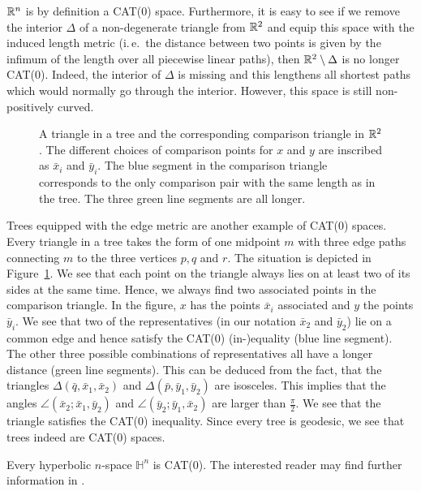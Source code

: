 \begin{bsp}
  \(\mathbb{R}^n\) is by definition a CAT(0) space. Furthermore, it is easy to see if we remove the interior \(\Delta\) of a non-degenerate triangle from \(\mathbb{R}^2\) and equip this space with the induced length metric (i.\,e.\ the distance between two points is given by the infimum of the length over all piecewise linear paths), then \(\mathbb{R}^2 \setminus \Delta\) is no longer CAT(0). Indeed, the interior of \(\Delta\) is missing and this lengthens all shortest paths which would normally go through the interior. However, this space is still non-positively curved.
\end{bsp}
\begin{bsp}[Trees]
  \begin{figure}[htbp]
    \centering
    
    \caption{A triangle in a tree and the corresponding comparison triangle in \(\mathbb{R}^2\). The different choices of comparison points for \(x\) and \(y\) are inscribed as \(\bar x_i\) and \(\bar y_i\). The blue segment in the comparison triangle corresponds to the only comparison pair with the same length as in the tree. The three green line segments are all longer.}
    \label{fig:cat-tree}
  \end{figure}
  Trees equipped with the edge metric are another example of CAT(0) spaces. Every triangle in a tree takes the form of one midpoint \(m\) with three edge paths connecting \(m\) to the three vertices \(p,q\) and \(r\). The situation is depicted in Figure~\ref{fig:cat-tree}. We see that each point on the triangle always lies on at least two of its sides at the same time. Hence, we always find two associated points in the comparison triangle. In the figure, \(x\) has the points \(\bar x_i\) associated and \(y\) the points \(\bar y_i\). We see that two of the representatives (in our notation \(\bar x_2\) and \(\bar y_2\)) lie on a common edge and hence satisfy the CAT(0) (in-)equality (blue line segment). The other three possible combinations of representatives all have a longer distance (green line segments). This can be deduced from the fact, that the triangles \(\Delta(\bar q, \bar x_1, \bar x_2)\) and \(\Delta(\bar p, \bar y_1, \bar y_2)\) are isosceles. This implies that the angles \(\angle(\bar x_2; \bar x_1, \bar y_2)\) and \(\angle(\bar y_2; \bar y_1, \bar x_2)\) are larger than \(\frac{\pi}{2}\). We see that the triangle satisfies the CAT(0) inequality. Since every tree is geodesic, we see that trees indeed are CAT(0) spaces.
\end{bsp}
\begin{bsp}
  Every hyperbolic \(n\)-space \(\mathbb{H}^n\) is CAT(0). The interested reader may find further information in \textcite[Section~II.1]{MR1744486}.
\end{bsp}


